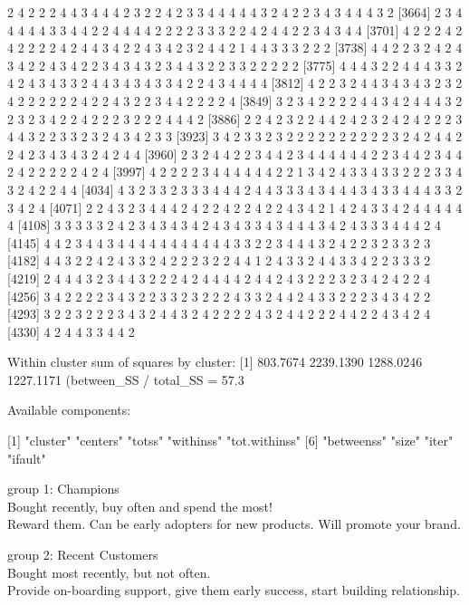 \begin{Schunk}
\begin{Soutput}
[3627] 2 4 2 2 2 4 4 3 4 4 4 2 3 2 2 4 2 3 3 4 4 4 4 4 3 2 4 2 2 3 4 3 4 4 4 3 2
[3664] 2 3 4 4 4 4 4 3 3 4 4 2 2 4 4 4 4 2 2 2 2 3 3 3 2 2 4 2 4 4 2 2 3 4 3 4 4
[3701] 4 2 2 2 4 2 4 2 2 2 2 4 2 4 4 3 4 2 2 4 3 4 2 3 2 4 4 2 1 4 4 3 3 3 2 2 2
[3738] 4 4 2 2 3 2 4 2 4 3 4 2 2 4 3 4 2 2 3 4 3 4 3 2 3 4 4 3 2 2 3 3 2 2 2 2 2
[3775] 4 4 4 3 2 2 4 4 4 3 3 2 4 2 4 3 4 3 3 2 4 4 3 4 3 4 3 3 4 2 2 4 3 4 4 4 4
[3812] 4 2 2 3 2 4 4 3 4 3 4 3 2 3 2 4 2 2 2 2 2 2 4 2 2 4 3 2 2 3 4 4 2 2 2 2 4
[3849] 3 2 3 4 2 2 2 2 4 4 3 4 2 4 4 4 3 2 2 3 2 3 4 2 2 4 2 2 2 3 2 2 2 4 4 4 2
[3886] 2 2 4 2 3 2 2 4 4 2 4 2 3 2 4 2 4 2 2 2 3 4 4 3 2 2 3 3 2 3 2 4 3 4 2 3 3
[3923] 3 4 2 3 3 2 3 2 2 2 2 2 2 2 2 2 2 3 2 4 2 4 4 2 2 4 2 3 4 3 4 3 2 4 2 4 4
[3960] 2 3 2 4 4 2 2 3 4 4 2 3 4 4 4 4 4 4 2 2 3 4 4 2 3 4 4 2 4 2 2 2 2 2 4 2 4
[3997] 4 2 2 2 2 3 4 4 4 4 4 4 2 2 1 3 4 2 4 3 3 4 3 3 2 2 2 3 3 4 3 2 4 2 2 4 4
[4034] 4 3 2 3 3 2 3 3 3 4 4 4 2 4 4 3 3 3 4 3 4 4 4 3 4 3 3 4 4 4 3 3 2 3 4 2 4
[4071] 2 2 4 3 2 3 4 4 4 2 4 2 2 4 2 2 4 2 2 4 3 4 2 1 4 2 4 3 3 4 2 4 4 4 4 4 4
[4108] 3 3 3 3 3 2 4 2 3 4 3 4 3 4 2 4 3 4 3 3 4 3 4 4 4 3 4 2 4 3 3 3 4 4 4 2 4
[4145] 4 4 2 3 4 4 3 4 4 4 4 4 4 4 4 4 4 4 3 3 2 2 3 4 4 4 3 2 4 2 2 3 2 3 3 2 3
[4182] 4 4 3 2 2 4 2 4 3 3 2 4 2 2 2 3 2 2 4 4 1 2 4 3 3 2 4 4 3 3 4 2 2 3 3 3 2
[4219] 2 4 4 4 3 2 3 4 4 3 2 2 2 4 2 4 4 4 4 2 4 4 2 4 3 2 2 2 3 2 3 4 2 4 2 2 4
[4256] 3 4 2 2 2 2 3 4 3 2 2 3 3 2 3 2 2 2 4 3 3 2 4 4 2 4 3 3 2 2 2 3 4 3 4 2 2
[4293] 3 2 2 3 2 2 2 3 4 3 2 4 4 3 2 4 2 2 2 2 4 3 2 4 4 2 2 2 4 4 2 2 4 3 4 2 4
[4330] 4 2 4 4 3 3 4 4 2

Within cluster sum of squares by cluster:
[1]  803.7674 2239.1390 1288.0246 1227.1171
 (between_SS / total_SS =  57.3 %)

Available components:

[1] "cluster"      "centers"      "totss"        "withinss"     "tot.withinss"
[6] "betweenss"    "size"         "iter"         "ifault"      
\end{Soutput}
\end{Schunk}

group 1: Champions\\
Bought recently, buy often and spend the most!\\
Reward them. Can be early adopters for new products. Will promote your
brand.

group 2: Recent Customers\\
Bought most recently, but not often.\\
Provide on-boarding support, give them early success, start building
relationship.

